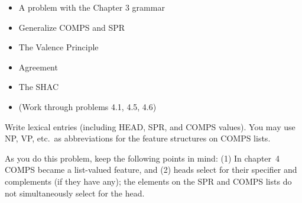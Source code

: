 \documentclass[a4paper,landscape,headrule,footrule]{foils}
\begin{document}
\begin{itemize}
\item A problem with the Chapter 3 grammar
\item Generalize COMPS and SPR
\item The Valence Principle
\item Agreement
\item The SHAC
\item (Work through problems 4.1, 4.5, 4.6)
\end{itemize}
 Write lexical entries (including
HEAD, SPR, and COMPS values). You may use NP, VP, etc.\ as
abbreviations for the feature structures on COMPS lists.

As you do this problem, keep the following points in mind: (1) In 
chapter~4 COMPS became a list-valued feature,
and (2) heads select for their specifier and complements (if they have
any); the elements on the SPR and COMPS lists do not
simultaneously select for the head.

\end{document}
